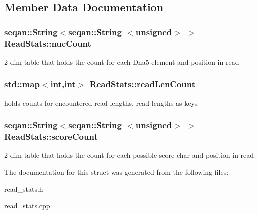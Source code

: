 \subsection{\-Member \-Data \-Documentation}
\hypertarget{structReadStats_aa8ce6cf2b6feee564b6d30190f5e9229}{
\subsubsection[{nuc\-Count}]{\setlength{\rightskip}{0pt plus 5cm}seqan\-::\-String$<$seqan\-::\-String $<$unsigned$>$ $>$ {\bf \-Read\-Stats\-::nuc\-Count}}}\label{structReadStats_aa8ce6cf2b6feee564b6d30190f5e9229}
2-\/dim table that holds the count for each \-Dna5 element and position in read \hypertarget{structReadStats_a2f389e19dcd24901f024df8e3cb41b25}{
\subsubsection[{read\-Len\-Count}]{\setlength{\rightskip}{0pt plus 5cm}std\-::map$<$int,int$>$ {\bf \-Read\-Stats\-::read\-Len\-Count}}}\label{structReadStats_a2f389e19dcd24901f024df8e3cb41b25}
holds counts for encountered read lengths, read lengths as keys \hypertarget{structReadStats_a301a09b8d357a68ece8140731f0c7a62}{
\subsubsection[{score\-Count}]{\setlength{\rightskip}{0pt plus 5cm}seqan\-::\-String$<$seqan\-::\-String $<$unsigned$>$ $>$ {\bf \-Read\-Stats\-::score\-Count}}}\label{structReadStats_a301a09b8d357a68ece8140731f0c7a62}
2-\/dim table that holds the count for each possible score char and position in read 

\-The documentation for this struct was generated from the following files\-:\begin{DoxyCompactItemize}
\item 
read\-\_\-stats.\-h\item 
read\-\_\-stats.\-cpp\end{DoxyCompactItemize}
